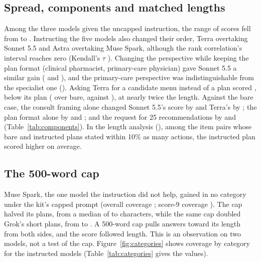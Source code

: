 \documentclass[11pt]{article}
\newcommand{\mainsec}[1]{\emph{\nameref{#1}}}
\begin{document}
\subsection{Spread, components and matched lengths}
\label{supp:components}
Among the three models given the uncapped instruction, the range of scores fell from
\covUncappedGridRangeBare{} to \covUncappedGridRangeSpec{}. Instructing the five models also changed
their order, Terra overtaking Sonnet 5.5 and Astra overtaking Muse Spark, although the rank
correlation's interval reaches zero (Kendall's $\tau$ \covPaperGridKendall{}
\covPaperGridKendallCI{}). Changing the perspective while keeping the plan format (clinical
pharmacist, primary-care physician) gave Sonnet 5.5 a similar gain (\covDPromptSonnetPharm{} and
\covDPromptSonnetPcp{}), and the primary-care perspective was indistinguishable from the specialist
one (\covDPcpVsSpec{}). Asking Terra for a
candidate menu instead of a plan scored \covFTerraMenu{}, below its plan (\covDPromptTerraMenu{} over
bare, against \covDPromptTerra{}), at nearly twice the length. Against the bare case, the consult
framing alone changed Sonnet 5.5's score by \covDSonnetFramingVsBare{} and Terra's by
\covDTerraFramingVsBare{}; the plan format alone by \covDSonnetFormatVsBare{} and
\covDTerraFormatVsBare{}; and the request for 25 recommendations by \covDSonnetLengthVsBare{} and
\covDTerraLengthVsBare{} (Table~\ref{tab:components}). In the length analysis
(\mainsec{sec:length}), among the \covMatchedItems{} item pairs whose bare and instructed plans
stated within 10\% as many actions, the instructed plan scored \covMatchedDiff{} higher on average.

\subsection{The 500-word cap}
\label{supp:cap}
Muse Spark, the one model the instruction did not help, gained in no category under the kit's capped
prompt (overall coverage \covCovAllMuseDiff{}; score-9 coverage \covCovNineMuseDiff{}). The cap
halved its plans, from a median of \covCharsMuseBare{} to \covCharsMuseThorough{} characters, while
the same cap doubled Grok's short plans, from \covCharsGrokBare{} to \covCharsGrokThorough{}. A
500-word cap pulls answers toward its length from both sides, and the score followed length. This is
an observation on two models, not a test of the cap. Figure~\ref{fig:categories} shows coverage by
category for the instructed models (Table~\ref{tab:categories} gives the values).
\end{document}
